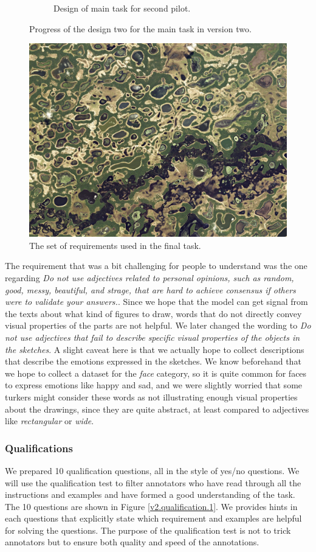 \begin{figure}[h]
\begin{subfigure}{0.5\textwidth}
  \caption{Design of main task for second pilot.}
  \label{v2.requirement.examples.6}
\end{subfigure}
\caption{Progress of the design two for the main task in version two.}
\label{v2.requirement.examples}
\end{figure}

\begin{figure}[h]
\includegraphics[width=.8\linewidth]{pantanal.jpeg}  
\caption{The set of requirements used in the final task.}
\label{v2.requirement.1}
\end{figure}

The requirement that was a bit challenging for people to understand was the one regarding
\textit{Do not use adjectives related to personal opinions, such as random, good, messy, beautiful, and strage, that are hard to achieve consensus if others were to validate your answers.}. Since we hope that the model can get signal from the texts about what kind of figures to draw, words that do not directly convey visual properties of the parts are not helpful. We later changed the wording to \textit{Do not use adjectives that fail to describe specific visual properties of the objects in the sketches}. A slight caveat here is that we actually hope to collect descriptions that describe the emotions expressed in the sketches. We know beforehand that we hope to collect a dataset for the \textit{face} category, so it is quite common for faces to express emotions like happy and sad, and we were slightly worried that some turkers might consider these words as not illustrating enough visual properties about the drawings, since they are quite abstract, at least compared to adjectives like \textit{rectangular} or \textit{wide}. 

\subsubsection{Qualifications}
We prepared 10 qualification questions, all in the style of yes/no questions. We will use the qualification test to filter annotators who have read through all the instructions and examples and have formed a good understanding of the task. The 10 questions are shown in Figure \ref{v2.qualification.1}. We provides hints in each questions that explicitly state which requirement and examples are helpful for solving the questions. The purpose of the qualification test is not to trick annotators but to ensure both quality and speed of the annotations. 

